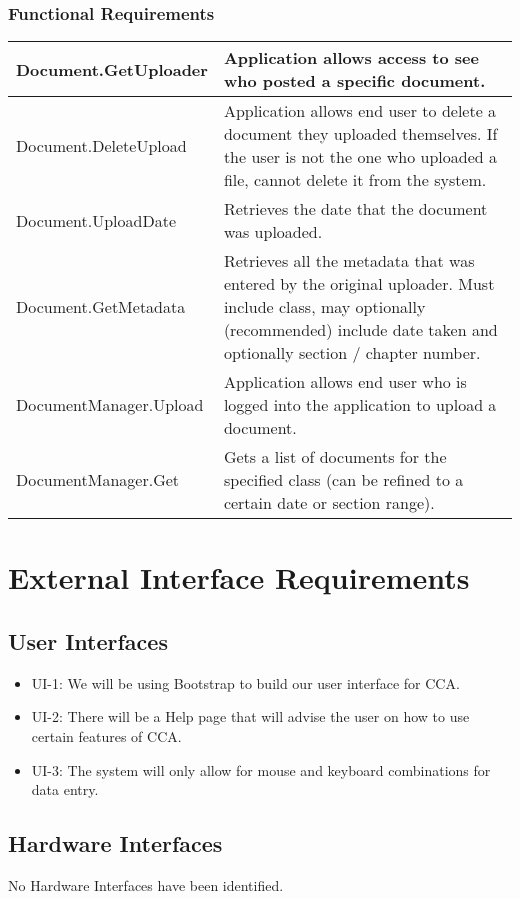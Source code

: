 \documentclass{scrreprt}
\begin{document}
\subsection{Functional Requirements}

\begin{tabular}{| p{4.5cm} | p{9.5cm} |}
\hline
Document.GetUploader & Application allows access to see who posted a specific document. \\ \hline
Document.DeleteUpload & Application allows end user to delete a document they uploaded themselves. If the user is not the one who uploaded a file, cannot delete it from the system. \\ \hline
Document.UploadDate & Retrieves the date that the document was uploaded. \\ \hline
Document.GetMetadata & Retrieves all the metadata that was entered by the original uploader. Must include class, may optionally (recommended) include date taken and optionally section / chapter number. \\ \hline
DocumentManager.Upload & Application allows end user who is logged into the application to upload a document. \\ \hline
DocumentManager.Get & Gets a list of documents for the specified class (can be refined to a certain date or section range). \\

\hline
\end{tabular}

\chapter{External Interface Requirements}
\section{User Interfaces}
\begin{itemize}
	\item UI-1: We will be using Bootstrap to build our user interface for CCA.
	\item UI-2: There will be a Help page that will advise the user on how to use certain features of CCA.
	\item UI-3: The system will only allow for mouse and keyboard combinations for data entry.
\end{itemize}

\section{Hardware Interfaces}
No Hardware Interfaces have been identified.
\end{document}
